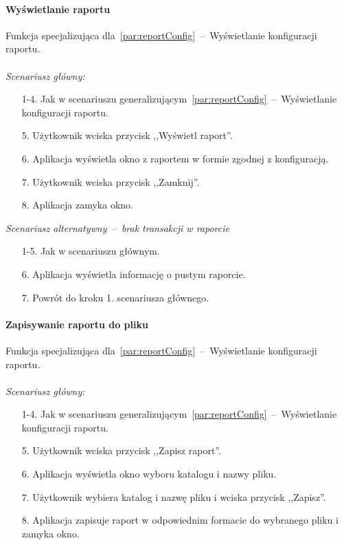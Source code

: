 \paragraph{Wyświetlanie raportu\newline}
\label{par:reportView}
\indent Funkcja specjalizująca dla~\ref{par:reportConfig}~--~Wyświetlanie konfiguracji raportu.\\\\
\textit{Scenariusz główny:}
\begin{enumerate}
  \item[1-4.] Jak w scenariuszu generalizującym~\ref{par:reportConfig}~--~Wyświetlanie konfiguracji raportu.
  \item[5.] Użytkownik wciska przycisk ,,Wyświetl raport''.
  \item[6.] Aplikacja wyświetla okno z raportem w formie zgodnej z konfiguracją.
  \item[7.] Użytkownik wciska przycisk ,,Zamknij''.
  \item[8.] Aplikacja zamyka okno.
\end{enumerate}

\textit{Scenariusz alternatywny~--~brak transakcji w raporcie}
\begin{enumerate}
  \item[1-5.] Jak w scenariuszu głównym.
  \item[6.] Aplikacja wyświetla informację o pustym raporcie.
  \item[7.] Powrót do kroku 1. scenariusza głównego.
\end{enumerate}

\paragraph{Zapisywanie raportu do pliku\newline}
\label{par:reportExport}
\indent Funkcja specjalizująca dla~\ref{par:reportConfig}~--~Wyświetlanie konfiguracji raportu.\\\\
\textit{Scenariusz główny:}
\begin{enumerate}
  \item[1-4.] Jak w scenariuszu generalizującym~\ref{par:reportConfig}~--~Wyświetlanie konfiguracji raportu.
  \item[5.] Użytkownik wciska przycisk ,,Zapisz raport''.
  \item[6.] Aplikacja wyświetla okno wyboru katalogu i nazwy pliku.
  \item[7.] Użytkownik wybiera katalog i nazwę pliku i wciska przycisk ,,Zapisz''.
  \item[8.] Aplikacja zapisuje raport w odpowiednim formacie do wybranego pliku i zamyka okno.
\end{enumerate}

